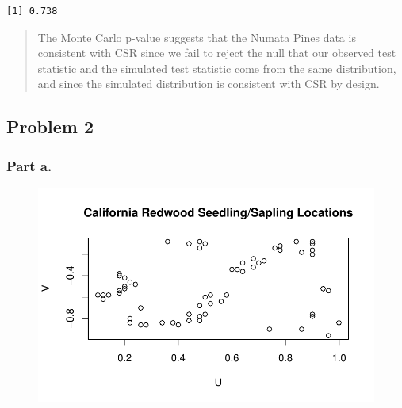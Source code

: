 \documentclass[
  letterpaper,
  DIV=11,
  numbers=noendperiod]{scrartcl}
\newenvironment{Shaded}{\begin{snugshade}}{\end{snugshade}}
\newcommand{\AttributeTok}[1]{\textcolor[rgb]{0.40,0.45,0.13}{#1}}
\newcommand{\FunctionTok}[1]{\textcolor[rgb]{0.28,0.35,0.67}{#1}}
\newcommand{\NormalTok}[1]{\textcolor[rgb]{0.00,0.23,0.31}{#1}}
\newcommand{\OtherTok}[1]{\textcolor[rgb]{0.00,0.23,0.31}{#1}}
\newcommand{\SpecialCharTok}[1]{\textcolor[rgb]{0.37,0.37,0.37}{#1}}
\newcommand{\StringTok}[1]{\textcolor[rgb]{0.13,0.47,0.30}{#1}}
\begin{document}
\begin{verbatim}
[1] 0.738
\end{verbatim}

\begin{quote}
The Monte Carlo p-value suggests that the Numata Pines data is
consistent with CSR since we fail to reject the null that our observed
test statistic and the simulated test statistic come from the same
distribution, and since the simulated distribution is consistent with
CSR by design.
\end{quote}

\hypertarget{problem-2}{%
\subsection{Problem 2}\label{problem-2}}

\hypertarget{part-a.-1}{%
\subsubsection{Part a.}\label{part-a.-1}}

\begin{Shaded}
\end{Shaded}

\begin{figure}[H]

{\centering \includegraphics{robby_homework_2_files/figure-pdf/unnamed-chunk-5-1.pdf}

}

\end{figure}
\end{document}
